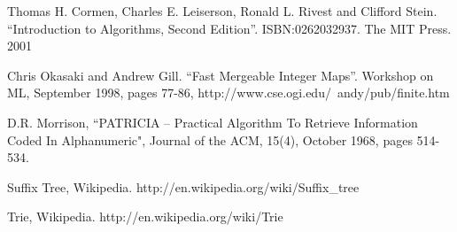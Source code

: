 \documentclass{article}
\begin{document}
\begin{thebibliography}{99}

Thomas H. Cormen, Charles E. Leiserson, Ronald L. Rivest and Clifford Stein. 
``Introduction to Algorithms, Second Edition''. ISBN:0262032937. The MIT Press. 2001

Chris Okasaki and Andrew Gill. ``Fast Mergeable Integer
Maps''. Workshop on ML, September 1998, pages 77-86, http://www.cse.ogi.edu/~andy/pub/finite.htm

D.R. Morrison, ``PATRICIA -- Practical Algorithm To Retrieve  Information Coded In Alphanumeric", Journal of the ACM, 15(4), October 1968, pages 514-534.

Suffix Tree, Wikipedia. http://en.wikipedia.org/wiki/Suffix\_tree

Trie, Wikipedia. http://en.wikipedia.org/wiki/Trie

\end{thebibliography}

\ifx\wholebook\relax\else
\end{document}

